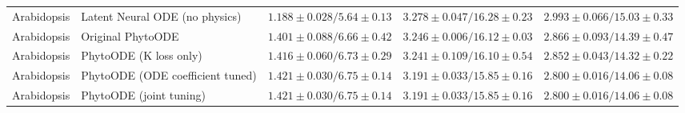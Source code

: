 \begin{table}[t]
{\begin{tabular}{llccc}
\midrule
Arabidopsis & Latent Neural ODE (no physics) & $\mathbf{1.188\pm0.028 / 5.64\pm0.13}$ & $3.278\pm0.047 / 16.28\pm0.23$ & $2.993\pm0.066 / 15.03\pm0.33$ \\
Arabidopsis & Original PhytoODE & $1.401\pm0.088 / 6.66\pm0.42$ & $3.246\pm0.006 / 16.12\pm0.03$ & $2.866\pm0.093 / 14.39\pm0.47$ \\
Arabidopsis & PhytoODE (K loss only) & $1.416\pm0.060 / 6.73\pm0.29$ & $3.241\pm0.109 / 16.10\pm0.54$ & $2.852\pm0.043 / 14.32\pm0.22$ \\
Arabidopsis & PhytoODE (ODE coefficient tuned) & $1.421\pm0.030 / 6.75\pm0.14$ & $\mathbf{3.191\pm0.033 / 15.85\pm0.16}$ & $\mathbf{2.800\pm0.016 / 14.06\pm0.08}$ \\
Arabidopsis & PhytoODE (joint tuning) & $1.421\pm0.030 / 6.75\pm0.14$ & $\mathbf{3.191\pm0.033 / 15.85\pm0.16}$ & $\mathbf{2.800\pm0.016 / 14.06\pm0.08}$ \\
\bottomrule
\end{tabular}}
\end{table}
